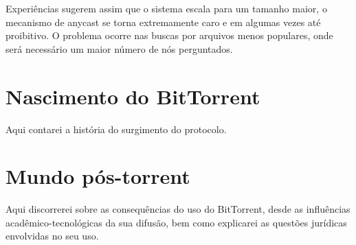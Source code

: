 Experiências sugerem assim que o sistema escala para um tamanho maior, o mecanismo de
\gls*{anycast} se torna extremamente caro e em algumas vezes até proibitivo. O problema
ocorre nas buscas por arquivos menos populares, onde será necessário um maior número de
nós perguntados.


\section{Nascimento do BitTorrent}

Aqui contarei a história do surgimento do protocolo.

\section{Mundo pós-torrent}

Aqui discorrerei sobre as consequências do uso do BitTorrent, desde as influências acadêmico-tecnológicas da sua difusão, bem como explicarei as questões jurídicas envolvidas no seu uso.

\clearpage
